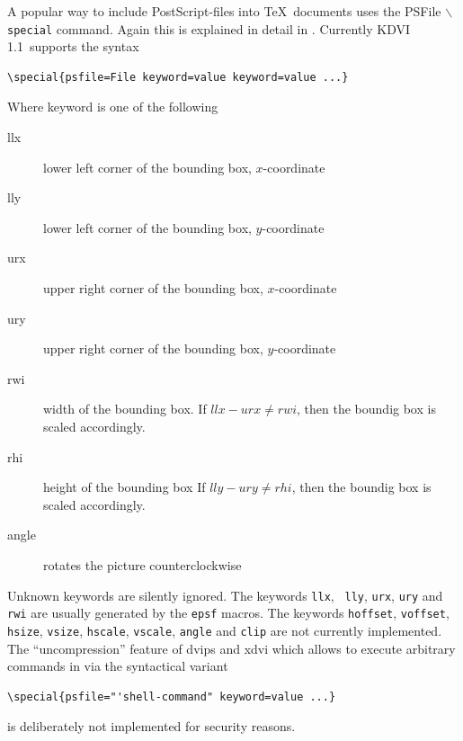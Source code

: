 \documentclass{article}
\newcommand{\KDVI}{{\sf KDVI 1.1}}
\begin{document}
A popular way to include PostScript-files into \TeX\ documents uses
the PSFile $\backslash${\tt special} command. Again this is explained
in detail in \cite{dvips}. Currently \KDVI\ supports the syntax
\begin{verbatim}
\special{psfile=File keyword=value keyword=value ...}
\end{verbatim}
Where keyword is one of the following
\begin{description}
\item[llx] lower left corner of the bounding box, $x$-coordinate
\item[lly] lower left corner of the bounding box, $y$-coordinate
\item[urx] upper right corner of the bounding box, $x$-coordinate
\item[ury] upper right corner of the bounding box, $y$-coordinate
\item[rwi] width of the bounding box. If $llx-urx \not = rwi$, then
the boundig box is scaled accordingly. 
\item[rhi] height of the bounding box If $lly-ury \not = rhi$, then
the boundig box is scaled accordingly.
\item[angle] rotates the picture counterclockwise
\end{description}
Unknown keywords are silently ignored. The keywords {\tt llx}, {\tt
  lly}, {\tt urx}, {\tt ury} and {\tt rwi} are usually generated by
the {\tt epsf} macros.  The keywords {\tt hoffset}, {\tt voffset},
{\tt hsize}, {\tt vsize}, {\tt hscale}, {\tt vscale}, {\tt angle} and
{\tt clip} are not currently implemented. The ``uncompression''
feature of {\sf dvips} and {\sf xdvi} which allows to execute
arbitrary commands in via the syntactical variant
\begin{verbatim}
\special{psfile="'shell-command" keyword=value ...}
\end{verbatim}
is deliberately not implemented for security reasons.
\end{document}
